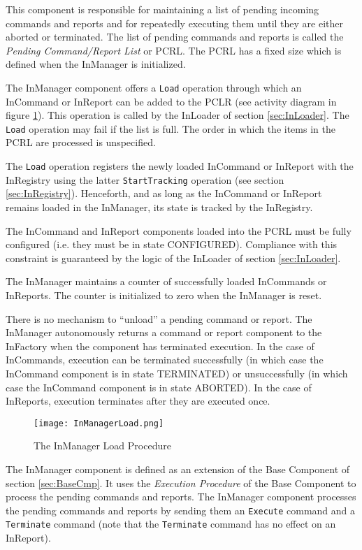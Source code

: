This component is responsible for maintaining a list of pending incoming commands and reports and for repeatedly executing them until they are either aborted or terminated.
The list of pending commands and reports is called the \textit{Pending Command/Report List} or PCRL. The PCRL has a fixed size which is defined when the InManager is initialized.
 
The InManager component offers a \texttt{Load} operation through which an InCommand or InReport can be added to the PCLR (see activity diagram in figure \ref{fig:InManagerLoad}). This operation is called by the InLoader of section \ref{sec:InLoader}. The \texttt{Load} operation may fail if the list is full. The order in which the items in the PCRL are processed is unspecified.

The \texttt{Load} operation registers the newly loaded InCommand or InReport with the InRegistry using the latter \texttt{StartTracking} operation (see section \ref{sec:InRegistry}). Henceforth, and as long as the InCommand or InReport remains loaded in the InManager, its state is tracked by the InRegistry. 

The InCommand and InReport components loaded into the PCRL must be fully configured (i.e. they must be in state CONFIGURED). Compliance with this constraint is guaranteed by the logic of the InLoader of section \ref{sec:InLoader}.

The InManager maintains a counter of successfully loaded InCommands or InReports. The counter is initialized to zero when the InManager is reset.

There is no mechanism to “unload” a pending command or report. The InManager autonomously returns a command or report component to the InFactory when the component has terminated execution. In the case of InCommands, execution can be terminated successfully (in which case the InCommand component is in state TERMINATED) or unsuccessfully (in which case the InCommand component is in state ABORTED). In the case of InReports, execution terminates after they are executed once. 

\begin{figure}[h]
 \centering
 \texttt{[image: InManagerLoad.png]}
 \caption{The InManager Load Procedure}
 \label{fig:InManagerLoad}
\end{figure}

The InManager component is defined as an extension of the Base Component of section \ref{sec:BaseCmp}. It uses the \textit{Execution Procedure} of the Base Component to process the pending commands and reports. The InManager component processes the pending commands and reports by sending them an \texttt{Execute} command and a \texttt{Terminate} command (note that the \texttt{Terminate} command has no effect on an InReport).

